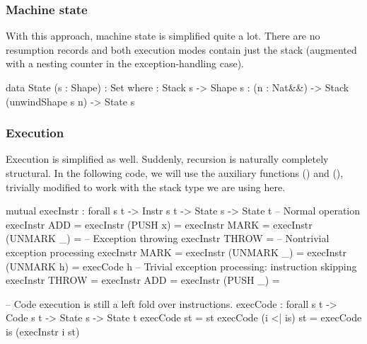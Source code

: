 \subsubsection{Machine state}

With this approach, machine state is simplified quite a lot. There are no
resumption records and both execution modes contain just the stack (augmented
with a nesting counter in the exception-handling case).

\begin{code}
  data State (s : Shape) : Set where
    \tick[_] : Stack s -> Shape s
    \x[_,_] : (n : Nat&\!&) -> Stack (unwindShape s n) -> State s
\end{code}

\subsubsection{Execution}

Execution is simplified as well.  Suddenly, recursion is naturally completely
structural. In the following code, we will use the auxiliary functions
 () and 
(), trivially modified to work with the stack type we
are using here.

\begin{codei}
  mutual
    execInstr : forall {s t} -> Instr s t -> State s -> State t
  	-- Normal operation
    execInstr ADD 					= \tick[ (x + y) \scons st ]
    execInstr (PUSH x)			\tick[ st ] 		= \tick[ x \scons st ]
    execInstr MARK				\tick[ st ] 		= 
    execInstr (UNMARK _)			= \tick[ x \scons st ]
    -- Exception throwing  
    execInstr THROW				\tick[ st ] =  
    -- Nontrivial exception processing
    execInstr MARK				\x[ n	 , st	] = \x[ suc n, st ]
    execInstr (UNMARK _)		\x[ suc n , st	] = \x[ n	, st ]
    execInstr (UNMARK h)		\x[ zero	 , st	] = execCode h \tick[ st ]
    -- Trivial exception processing: instruction skipping
    execInstr THROW			\x[ n , st ] = \x[ n , st ]
    execInstr ADD			\x[ n , st ] = \x[ n , st ]
    execInstr (PUSH _)		\x[ n , st ] = \x[ n , st ]
\end{codei}
\begin{code}
    -- Code execution is still a left fold over instructions.
    execCode : forall {s t} -> Code s t -> State s -> State t
    execCode \nil st = st
    execCode (i <| is) st = execCode is (execInstr i st)
\end{code}


